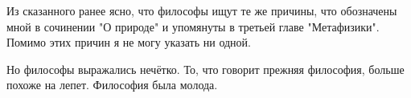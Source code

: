 \documentclass{article}
\begin{document}
Из сказанного ранее ясно, что философы ищут те же причины, что обозначены мной в сочинении "О природе" и упомянуты в третьей главе "Метафизики". Помимо этих причин я не могу указать ни одной.

Но философы
\footnotemark[1]
выражались нечётко. То, что говорит прежняя философия, больше похоже на лепет. Философия была молода.
\end{document}

